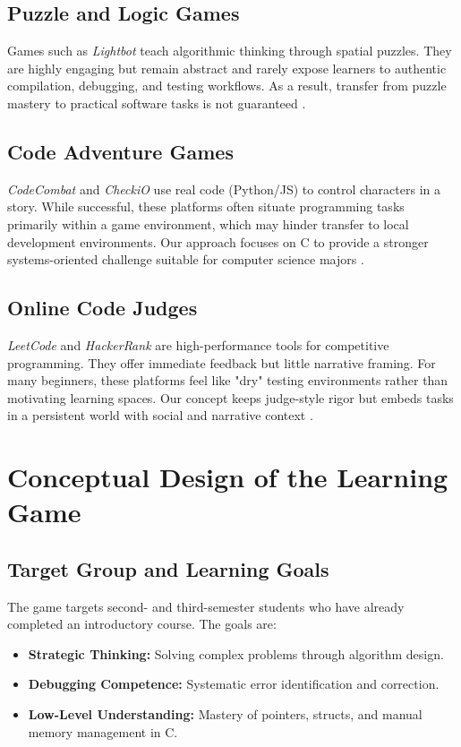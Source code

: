 \documentclass[a4paper, UKenglish, cleveref, autoref, thm-restate]{oasics-v2021}
\begin{document}
\subsection{Puzzle and Logic Games}
Games such as \textit{Lightbot} teach algorithmic thinking through spatial puzzles. They are highly engaging but remain abstract and rarely expose learners to authentic compilation, debugging, and testing workflows. As a result, transfer from puzzle mastery to practical software tasks is not guaranteed \cite{yallihep2019mobile}.

\subsection{Code Adventure Games}
\textit{CodeCombat} and \textit{CheckiO} use real code (Python/JS) to control characters in a story. While successful, these platforms often situate programming tasks primarily within a game environment, which may hinder transfer to local development environments. Our approach focuses on C to provide a stronger systems-oriented challenge suitable for computer science majors \cite{kroustalli2021codecombat}.

\subsection{Online Code Judges}
\textit{LeetCode} and \textit{HackerRank} are high-performance tools for competitive programming. They offer immediate feedback but little narrative framing. For many beginners, these platforms feel like "dry" testing environments rather than motivating learning spaces. Our concept keeps judge-style rigor but embeds tasks in a persistent world with social and narrative context \cite{hua2020onlinejudge}.

\section{Conceptual Design of the Learning Game}
\subsection{Target Group and Learning Goals}
The game targets second- and third-semester students who have already completed an introductory course. The goals are:
\begin{itemize}
    \item \textbf{Strategic Thinking:} Solving complex problems through algorithm design.
    \item \textbf{Debugging Competence:} Systematic error identification and correction.
    \item \textbf{Low-Level Understanding:} Mastery of pointers, structs, and manual memory management in C.
\end{itemize}
\end{document}

